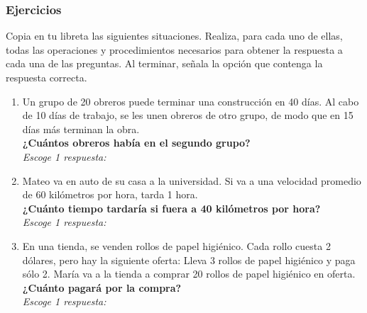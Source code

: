 \documentclass[11pt]{book}
\begin{document}
\subsubsection{Ejercicios}
Copia en tu libreta las siguientes situaciones. Realiza, para cada uno de ellas, todas las operaciones y
procedimientos necesarios para obtener la respuesta a cada una de las preguntas. Al terminar, señala la
opción que contenga la respuesta correcta.
\begin{enumerate}%
  \item Un grupo de 20 obreros puede terminar una
        construcción en 40 días. Al cabo de 10 días de trabajo,
        se les unen obreros de otro grupo, de modo que en 15 días
        más terminan la obra.\\
        \textbf{¿Cuántos obreros había en el segundo grupo?}\\
        \emph{Escoge 1 respuesta:}\\

  \item Mateo va en auto de su casa a la universidad. Si va a una velocidad promedio de 60 kilómetros por hora, tarda 1 hora.\\
        \textbf{¿Cuánto tiempo tardaría si fuera a 40 kilómetros por hora?}\\
        \emph{Escoge 1 respuesta:}\\

  \item En una tienda, se venden rollos de papel higiénico. Cada rollo cuesta 2 dólares, pero hay la siguiente oferta:
        Lleva 3 rollos de papel higiénico y paga s\'olo 2.
        María va a la tienda a comprar 20 rollos de papel higiénico en oferta.\\
        \textbf{¿Cuánto pagará por la compra?}\\
        \emph{Escoge 1 respuesta:}\\


\end{enumerate}
\end{document}

